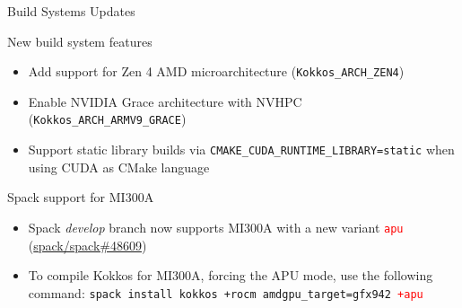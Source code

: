 
\begin{frame}[fragile]

  {\Huge Build Systems Updates}

  \vspace{10pt}

\end{frame}




\begin{frame}[fragile]{New build system features}
  \begin{itemize}
    \item Add support for Zen 4 AMD microarchitecture (\texttt{Kokkos\_ARCH\_ZEN4})
    \item Enable NVIDIA Grace architecture with NVHPC (\texttt{Kokkos\_ARCH\_ARMV9\_GRACE})
    \item Support static library builds via \texttt{CMAKE\_CUDA\_RUNTIME\_LIBRARY=static} when using CUDA as CMake language
  \end{itemize}

\end{frame}


\begin{frame}[fragile]{Spack support for MI300A}
  \begin{itemize}
    \item Spack \textit{develop} branch now supports MI300A with a new variant \textcolor{red}{\texttt{apu}}
    (\href{https://github.com/spack/spack/pull/48609}{spack/spack\#48609})

    \item To compile Kokkos for MI300A, forcing the APU mode, use the following command:
    \texttt{spack install kokkos +rocm amdgpu\_target=gfx942 \textcolor{red}{+apu}}

  \end{itemize}

\end{frame}


